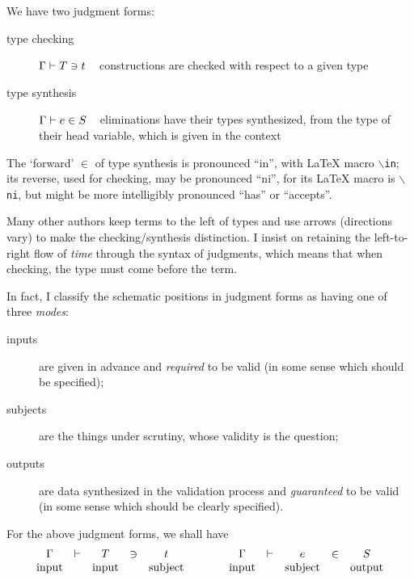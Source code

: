 \documentclass[natbib]{article}
\begin{document}
We have two judgment forms:
\begin{description}
\item[type checking] $\Gamma \vdash T \ni t$ ~ constructions are checked with respect to a given type
\item[type synthesis] $\Gamma \vdash e \in S$ ~ eliminations have their types synthesized, from the type of their head variable, which is given in the context
\end{description}
The `forward' $\in$ of type synthesis is pronounced ``in'', with \LaTeX{} macro {\tt $\backslash$in}; its reverse, used for checking, may be pronounced ``ni'', for its \LaTeX{} macro is {\tt $\backslash$ni}, but
might be more intelligibly pronounced ``has'' or ``accepts''.

Many other authors keep terms to the left of types and use arrows (directions vary) to make the checking/synthesis distinction. I insist on retaining the left-to-right flow of \emph{time} through the
syntax of judgments, which means that when checking, the type must come before the term.

In fact, I classify the schematic positions in judgment forms as having one of three \emph{modes}:
\begin{description}
\item[inputs] are given in advance and \emph{required} to be valid (in some sense which should be specified);
\item[subjects] are the things under scrutiny, whose validity is the question;
\item[outputs] are data synthesized in the validation process and \emph{guaranteed} to be valid
  (in some sense which should be clearly specified).
\end{description}

For the above judgment forms, we shall have
\[\begin{array}{ccccc@{\qquad\qquad}ccccc}
\CHK{\Gamma&}{&T&}{&t} & \SYN{\Gamma&}{&e&}{&S}\\
\mbox{input} && \mbox{input} && \mbox{subject} &
\mbox{input} && \mbox{subject} && \mbox{output}
\end{array}\]
\end{document}
